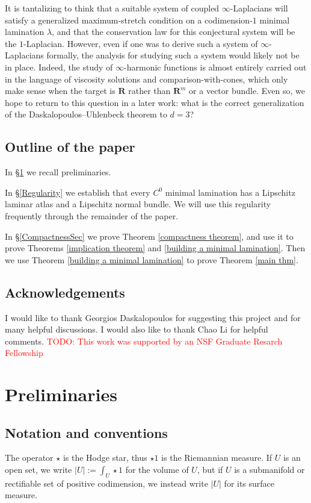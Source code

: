 \documentclass[reqno,11pt]{amsart}
\newcommand{\RR}{\mathbf{R}}
\theoremstyle{definition}
\numberwithin{equation}{section}
\newcommand\todo[1]{\textcolor{red}{TODO: #1}}
\begin{document}
It is tantalizing to think that a suitable system of coupled $\infty$-Laplacians will satisfy a generalized maximum-stretch condition on a codimension-$1$ minimal lamination $\lambda$, and that the conservation law for this conjectural system will be the $1$-Laplacian.
However, even if one was to derive such a system of $\infty$-Laplacians formally, the analysis for studying such a system would likely not be in place.
Indeed, the study of $\infty$-harmonic functions is almost entirely carried out in the language of viscosity solutions and comparison-with-cones, which only make sense when the target is $\RR$ rather than $\RR^m$ or a vector bundle.
Even so, we hope to return to this question in a later work: what is the correct generalization of the Daskalopoulos--Uhlenbeck theorem to $d = 3$?

\subsection{Outline of the paper}
In \S\ref{Prelims} we recall preliminaries.

In \S\ref{Regularity} we establish that every $C^0$ minimal lamination has a Lipschitz laminar atlas and a Lipschitz normal bundle.
We will use this regularity frequently through the remainder of the paper.

In \S\ref{CompactnessSec} we prove Theorem \ref{compactness theorem},
and use it to prove Theorems \ref{implication theorem} and \ref{building a minimal lamination}.
Then we use Theorem \ref{building a minimal lamination} to prove Theorem \ref{main thm}.


\subsection{Acknowledgements}
I would like to thank Georgios Daskalopoulos for suggesting this project and for many helpful discussions.
I would also like to thank Chao Li for helpful comments.
\todo{This work was supported by an NSF Graduate Resarch Fellowship}




\section{Preliminaries}\label{Prelims}
\subsection{Notation and conventions}
The operator $\star$ is the Hodge star, thus $\star 1$ is the Riemannian measure.
If $U$ is an open set, we write $|U| := \int_U \star 1$ for the volume of $U$, but if $U$ is a submanifold or rectifiable set of positive codimension, we instead write $|U|$ for its surface measure.
\end{document}
